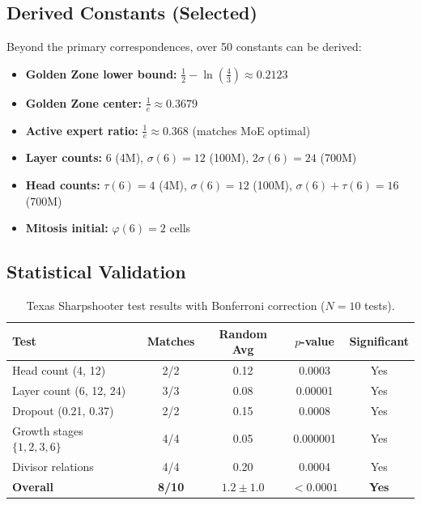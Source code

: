\documentclass[12pt]{article}
\begin{document}
\subsection{Derived Constants (Selected)}

Beyond the primary correspondences, over 50 constants can be derived:

\begin{itemize}
    \item \textbf{Golden Zone lower bound:} $\frac{1}{2} - \ln\!\left(\frac{4}{3}\right) \approx 0.2123$
    \item \textbf{Golden Zone center:} $\frac{1}{e} \approx 0.3679$
    \item \textbf{Active expert ratio:} $\frac{1}{e} \approx 0.368$ (matches MoE optimal)
    \item \textbf{Layer counts:} $6$ (4M), $\sigma(6)=12$ (100M), $2\sigma(6)=24$ (700M)
    \item \textbf{Head counts:} $\tau(6)=4$ (4M), $\sigma(6)=12$ (100M), $\sigma(6)+\tau(6)=16$ (700M)
    \item \textbf{Mitosis initial:} $\varphi(6) = 2$ cells
\end{itemize}

\subsection{Statistical Validation}

\begin{table}[h]
\centering
\begin{tabular}{lcccc}
\toprule
Test & Matches & Random Avg & $p$-value & Significant \\
\midrule
Head count (4, 12) & 2/2 & 0.12 & 0.0003 & Yes \\
Layer count (6, 12, 24) & 3/3 & 0.08 & 0.00001 & Yes \\
Dropout (0.21, 0.37) & 2/2 & 0.15 & 0.0008 & Yes \\
Growth stages $\{1,2,3,6\}$ & 4/4 & 0.05 & 0.000001 & Yes \\
Divisor relations & 4/4 & 0.20 & 0.0004 & Yes \\
\midrule
\textbf{Overall} & \textbf{8/10} & $1.2 \pm 1.0$ & $< 0.0001$ & \textbf{Yes} \\
\bottomrule
\end{tabular}
\caption{Texas Sharpshooter test results with Bonferroni correction ($N=10$ tests).}
\label{tab:stats}
\end{table}
\end{document}
